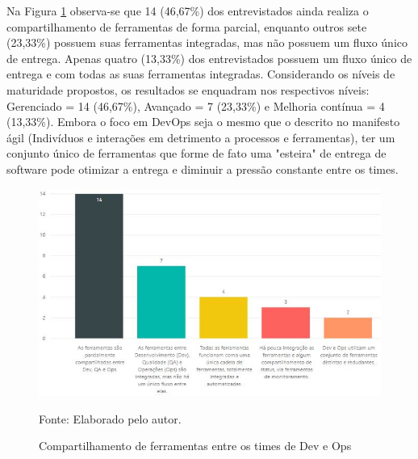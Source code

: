 \documentclass[twoside,english,brazilian]{UNISINOSartigo}
\newcommand{\source}[1]{\caption*{Fonte: {#1}} }
\begin{document}
Na Figura \ref{fig:compartFerramentas} observa-se que 14 (46,67\%) dos entrevistados ainda realiza o compartilhamento de ferramentas de forma parcial, enquanto outros sete (23,33\%) possuem suas ferramentas integradas, mas não possuem um fluxo único de entrega. Apenas quatro (13,33\%) dos entrevistados possuem um fluxo único de entrega e com todas as suas ferramentas integradas.
Considerando os níveis de maturidade propostos, os resultados se enquadram nos respectivos níveis: Gerenciado = 14 (46,67\%), Avançado = 7 (23,33\%) e Melhoria contínua = 4 (13,33\%).
Embora o foco em DevOps seja o mesmo que o descrito no manifesto ágil (Indivíduos e interações em detrimento a processos e ferramentas), ter um conjunto único de ferramentas que forme de fato uma "esteira" de entrega de software pode otimizar a entrega e diminuir a pressão constante entre os times.
\begin{figure}[H]
    \centering
    \caption{Compartilhamento de ferramentas entre os times de Dev e Ops}
       \includegraphics[scale=.6]{imagens/compartilhamentoFerramentas.JPG}
        \source{Elaborado pelo autor.}
    \label{fig:compartFerramentas}
\end{figure}
\end{document}
